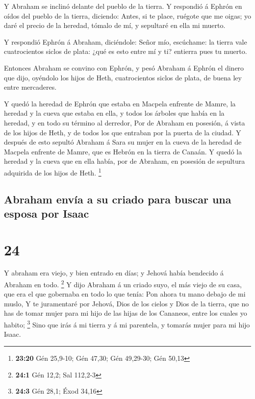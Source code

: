  Y Abraham se inclinó delante del pueblo de la tierra.
 Y respondió á Ephrón en oídos del pueblo de la tierra,
diciendo: Antes, si te place, ruégote que me oigas; yo daré el precio de
la heredad, tómalo de mí, y sepultaré en ella mi muerto.

 Y respondió Ephrón á Abraham, diciéndole: 
Señor mío, escúchame: la tierra vale cuatrocientos siclos de plata: ¿qué
es esto entre mí y ti? entierra pues tu muerto.

 Entonces Abraham se convino con Ephrón, y pesó Abraham á
Ephrón el dinero que dijo, oyéndolo los hijos de Heth, cuatrocientos
siclos de plata, de buena ley entre mercaderes.

 Y quedó la heredad de Ephrón que estaba en Macpela
enfrente de Mamre, la heredad y la cueva que estaba en ella, y todos los
árboles que había en la heredad, y en todo su término al derredor,
 Por de Abraham en posesión, á vista de los hijos de Heth,
y de todos los que entraban por la puerta de la ciudad.  Y
después de esto sepultó Abraham á Sara su mujer en la cueva de la
heredad de Macpela enfrente de Mamre, que es Hebrón en la tierra de
Canaán.  Y quedó la heredad y la cueva que en ella había,
por de Abraham, en posesión de sepultura adquirida de los hijos de Heth.
\footnote{\textbf{23:20} Gén 25,9-10; Gén 47,30; Gén 49,29-30; Gén 50,13}

\hypertarget{abraham-envuxeda-a-su-criado-para-buscar-una-esposa-por-isaac}{%
\subsection{Abraham envía a su criado para buscar una esposa por
Isaac}\label{abraham-envuxeda-a-su-criado-para-buscar-una-esposa-por-isaac}}

\hypertarget{section-23}{%
\section{24}\label{section-23}}

 Y abraham era viejo, y bien entrado en días; y Jehová había
bendecido á Abraham en todo. \footnote{\textbf{24:1} Gén 12,2; Sal
  112,2-3}  Y dijo Abraham á un criado suyo, el más viejo de
su casa, que era el que gobernaba en todo lo que tenía: Pon ahora tu
mano debajo de mi muslo,  Y te juramentaré por Jehová, Dios
de los cielos y Dios de la tierra, que no has de tomar mujer para mi
hijo de las hijas de los Cananeos, entre los cuales yo habito;
\footnote{\textbf{24:3} Gén 28,1; Éxod 34,16}  Sino que irás
á mi tierra y á mi parentela, y tomarás mujer para mi hijo Isaac.

